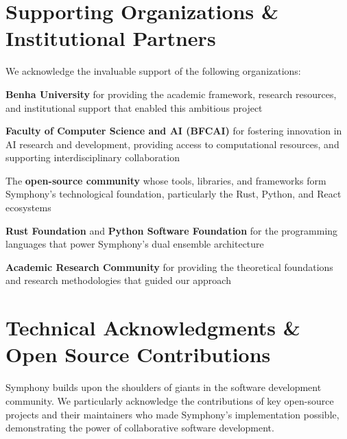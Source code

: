 \section*{Supporting Organizations \& Institutional Partners}

We acknowledge the invaluable support of the following organizations:

\begin{expandedlist}
    \item \textbf{Benha University} for providing the academic framework, research resources, and institutional support that enabled this ambitious project
    \item \textbf{Faculty of Computer Science and AI (BFCAI)} for fostering innovation in AI research and development, providing access to computational resources, and supporting interdisciplinary collaboration
    \item The \textbf{open-source community} whose tools, libraries, and frameworks form Symphony's technological foundation, particularly the Rust, Python, and React ecosystems
    \item \textbf{Rust Foundation} and \textbf{Python Software Foundation} for the programming languages that power Symphony's dual ensemble architecture
    \item \textbf{Academic Research Community} for providing the theoretical foundations and research methodologies that guided our approach
\end{expandedlist}

\section*{Technical Acknowledgments \& Open Source Contributions}

\begin{alertbox}
Symphony builds upon the shoulders of giants in the software development community. We particularly acknowledge the contributions of key open-source projects and their maintainers who made Symphony's implementation possible, demonstrating the power of collaborative software development.
\end{alertbox}

